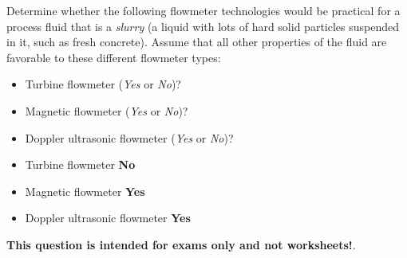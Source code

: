 

Determine whether the following flowmeter technologies would be practical for a process fluid that is a {\it slurry} (a liquid with lots of hard solid particles suspended in it, such as fresh concrete).  Assume that all other properties of the fluid are favorable to these different flowmeter types:

\begin{itemize}
\item{} Turbine flowmeter ({\it Yes} or {\it No})?
\vskip 10pt
\item{} Magnetic flowmeter ({\it Yes} or {\it No})?
\vskip 10pt
\item{} Doppler ultrasonic flowmeter ({\it Yes} or {\it No})?
\end{itemize}







\begin{itemize}
\item{} Turbine flowmeter {\bf No}
\item{} Magnetic flowmeter {\bf Yes}
\item{} Doppler ultrasonic flowmeter {\bf Yes}
\end{itemize}







{\bf This question is intended for exams only and not worksheets!}.



